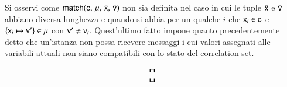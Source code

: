 Si osservi come ${\sf match}({\sf c},\, {\sf \mu},\, \bar{{\sf x}},\, \bar{{\sf v}})$ non sia
definita nel caso in cui le tuple $\bar{{\sf x}}$ e $\bar{{\sf v}}$ abbiano diversa
lunghezza e quando si abbia per un qualche $i$ che ${\sf x}_i \in {\sf c}$ e
$\{{\sf x}_i \mapsto {\sf v}'\} \in {\sf \mu}$ con ${\sf v}' \neq {\sf v}_i$. 
Quest'ultimo fatto impone quanto precedentemente detto che un'istanza non possa
ricevere messaggi i cui valori assegnati alle variabili attuali non siano
compatibili con lo stato del correlation set.

\begin{table}[t!]
\begin{center} 
\begin{small}
$$
\delimite{
\begin{array}{c}
%

\end{array}}$$
\end{small}
\end{center}
\end{table}
